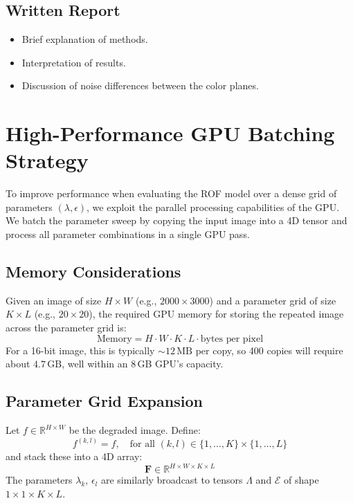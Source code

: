 \documentclass{article}
\begin{document}
\subsection{Written Report}
\begin{itemize}
    \item Brief explanation of methods.
    \item Interpretation of results.
    \item Discussion of noise differences between the color planes.
\end{itemize}

\section{High-Performance GPU Batching Strategy}

To improve performance when evaluating the ROF model over a dense grid of parameters
\((\lambda, \epsilon)\), we exploit the parallel processing capabilities of the GPU. 
We batch the parameter sweep by copying the input image into a 4D tensor and process 
all parameter combinations in a single GPU pass.

\subsection{Memory Considerations}

Given an image of size \( H \times W \) (e.g., \(2000 \times 3000\)) and a 
parameter grid of size \( K \times L \) (e.g., \(20 \times 20\)), the required
GPU memory for storing the repeated image across the parameter grid is:
\[
\text{Memory} = H \cdot W \cdot K \cdot L \cdot \text{bytes per pixel}
\]
For a 16-bit image, this is typically \( \sim 12\,\text{MB} \) per copy, 
so 400 copies will require about \(4.7\,\text{GB}\), well within an 8\,GB 
GPU's capacity.

\subsection{Parameter Grid Expansion}

Let \( f \in \mathbb{R}^{H \times W} \) be the degraded image. Define:
\[
f^{(k,l)} = f, \quad \text{for all } (k,l) \in \{1,\ldots,K\} \times \{1,\ldots,L\}
\]
and stack these into a 4D array:
\[
\mathbf{F} \in \mathbb{R}^{H \times W \times K \times L}
\]
The parameters \( \lambda_{k} \), \( \epsilon_{l} \) are similarly broadcast 
to tensors \( \Lambda \) and \( \mathcal{E} \) of shape \(1 \times 1 \times K \times L\).
\end{document}
